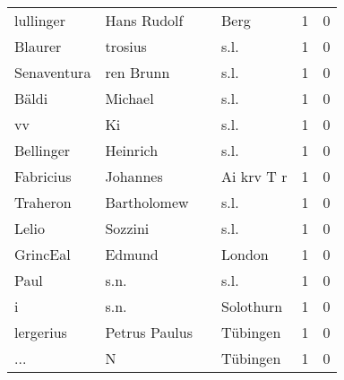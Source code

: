 \begin{tabular}{llllrr}
                lullinger &                        Hans Rudolf &             &                                        Berg &          1 &         0 \\
                  Blaurer &                            trosius &             &                                        s.l. &          1 &         0 \\
              Senaventura &                          ren Brunn &             &                                        s.l. &          1 &         0 \\
                    Bäldi &                            Michael &             &                                        s.l. &          1 &         0 \\
                       vv &                                 Ki &             &                                        s.l. &          1 &         0 \\
                Bellinger &                           Heinrich &             &                                        s.l. &          1 &         0 \\
                Fabricius &                           Johannes &             &                                  Ai krv T r &          1 &         0 \\
                 Traheron &                        Bartholomew &             &                                        s.l. &          1 &         0 \\
                    Lelio &                            Sozzini &             &                                        s.l. &          1 &         0 \\
                 GrincEal &                             Edmund &             &                                      London &          1 &         0 \\
                     Paul &                               s.n. &             &                                        s.l. &          1 &         0 \\
                        i &                               s.n. &             &                                   Solothurn &          1 &         0 \\
                lergerius &                      Petrus Paulus &             &                                    Tübingen &          1 &         0 \\
                      ... &                                  N &             &                                    Tübingen &          1 &         0 \\

\end{tabular}
